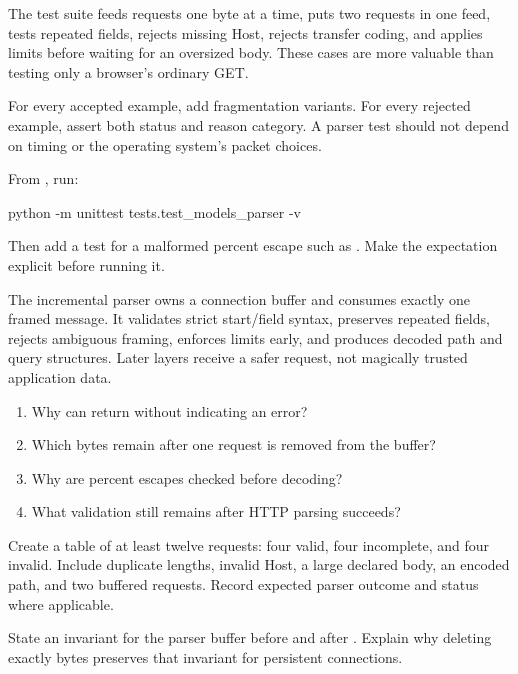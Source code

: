 The test suite feeds requests one byte at a time, puts two requests in one feed,
tests repeated fields, rejects missing Host, rejects transfer coding, and applies
limits before waiting for an oversized body. These cases are more valuable than
testing only a browser's ordinary GET.

For every accepted example, add fragmentation variants. For every rejected
example, assert both status and reason category. A parser test should not depend
on timing or the operating system's packet choices.

\begin{tryit}
From , run:
\begin{wiremessage}
python -m unittest tests.test_models_parser -v
\end{wiremessage}
Then add a test for a malformed percent escape such as . Make
the expectation explicit before running it.
\end{tryit}

\summarytitle

The incremental parser owns a connection buffer and consumes exactly one framed
message. It validates strict start/field syntax, preserves repeated fields,
rejects ambiguous framing, enforces limits early, and produces decoded path and
query structures. Later layers receive a safer request, not magically trusted
application data.

\reviewtitle
\begin{enumerate}
  \item Why can  return  without indicating an error?
  \item Which bytes remain after one request is removed from the buffer?
  \item Why are percent escapes checked before decoding?
  \item What validation still remains after HTTP parsing succeeds?
\end{enumerate}

\begin{exercise}
Create a table of at least twelve requests: four valid, four incomplete, and four
invalid. Include duplicate lengths, invalid Host, a large declared body, an
encoded path, and two buffered requests. Record expected parser outcome and
status where applicable.
\end{exercise}

\begin{exercise}
State an invariant for the parser buffer before and after .
Explain why deleting exactly  bytes preserves
that invariant for persistent connections.
\end{exercise}
